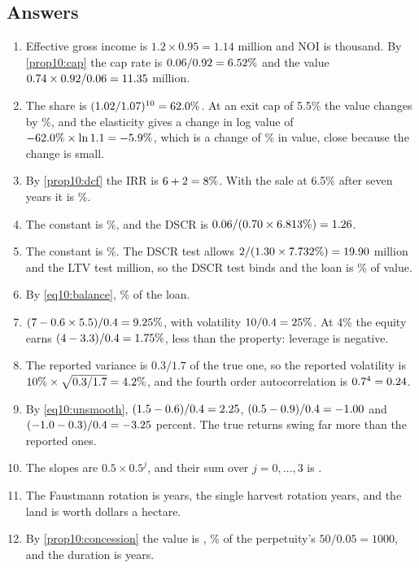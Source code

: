 \begin{chapterrefs}
\subsection*{Answers}
\begin{enumerate}[label=\textbf{10.\arabic*}, leftmargin=*]
  \item Effective gross income is $1.2\times0.95=1.14$ million and NOI is \xaNoi{} thousand. By
  \cref{prop10:cap} the cap rate is $0.06/0.92=6.52\%$ and the value $0.74\times0.92/0.06=11.35$ million.
  \item The share is $(1.02/1.07)^{10}=62.0\%$. At an exit cap of 5.5\% the value changes by \xbDrop\%,
  and the elasticity gives a change in log value of $-62.0\%\times\ln1.1=-5.9\%$, which is a
  change of \xbApproxPct\% in value, close because the change is small.
  \item By \cref{prop10:dcf} the IRR is $6+2=8\%$. With the sale at 6.5\% after seven years it is \xcIrrHigh\%.
  \item The constant is \xdK\%, and the DSCR is $0.06/(0.70\times6.813\%)=1.26$.
  \item The constant is \xeK\%. The DSCR test allows $2/(1.30\times7.732\%)=19.90$ million and the LTV test
  \xeLtvLoan{} million, so the DSCR test binds and the loan is \xeLtv\% of value.
  \item By \cref{eq10:balance}, \xfBal\% of the loan.
  \item $(7-0.6\times5.5)/0.4=9.25\%$, with volatility $10/0.4=25\%$. At 4\% the equity earns
  $(4-3.3)/0.4=1.75\%$, less than the property: leverage is negative.
  \item The reported variance is $0.3/1.7$ of the true one, so the reported volatility is
  $10\%\times\sqrt{0.3/1.7}=4.2\%$, and the fourth order autocorrelation is $0.7^4=0.24$.
  \item By \cref{eq10:unsmooth}, $(1.5-0.6)/0.4=2.25$, $(0.5-0.9)/0.4=-1.00$ and
  $(-1.0-0.3)/0.4=-3.25$ percent. The true returns swing far more than the reported ones.
  \item The slopes are $0.5\times0.5^j$, and their sum over $j=0,\dots,3$ is \xjSum.
  \item The Faustmann rotation is \xkF{} years, the single harvest rotation \xkS{} years, and the land is
  worth \xkLev{} dollars a hectare.
  \item By \cref{prop10:concession} the value is \xlV, \xlShare\% of the perpetuity's $50/0.05=1000$, and the
  duration is \xlDur{} years.

\end{enumerate}
\end{chapterrefs}
